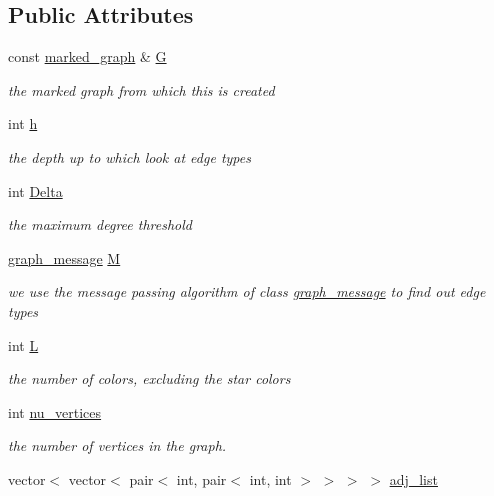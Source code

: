 \subsection*{Public Attributes}
\begin{DoxyCompactItemize}
\item 
const \hyperlink{classmarked__graph}{marked\+\_\+graph} \& \hyperlink{classcolored__graph_a39186b56cad58c368d6947656976e18d}{G}
\begin{DoxyCompactList}\small\item\em the marked graph from which this is created \end{DoxyCompactList}\item 
int \hyperlink{classcolored__graph_ae27062a4ee59df2670d3a0c81e85a3fa}{h}
\begin{DoxyCompactList}\small\item\em the depth up to which look at edge types \end{DoxyCompactList}\item 
int \hyperlink{classcolored__graph_a5b0e93eb40a20dc815c809dee11edc12}{Delta}
\begin{DoxyCompactList}\small\item\em the maximum degree threshold \end{DoxyCompactList}\item 
\hyperlink{classgraph__message}{graph\+\_\+message} \hyperlink{classcolored__graph_ab72c568fe12f7c849ca6bffb145aec47}{M}
\begin{DoxyCompactList}\small\item\em we use the message passing algorithm of class \hyperlink{classgraph__message}{graph\+\_\+message} to find out edge types \end{DoxyCompactList}\item 
int \hyperlink{classcolored__graph_ae159d1b15106b70a2eabef8884501e97}{L}
\begin{DoxyCompactList}\small\item\em the number of colors, excluding the star colors \end{DoxyCompactList}\item 
int \hyperlink{classcolored__graph_a90ece8eb1fec52f3f41549ab527c1d5b}{nu\+\_\+vertices}
\begin{DoxyCompactList}\small\item\em the number of vertices in the graph. \end{DoxyCompactList}\item 
vector$<$ vector$<$ pair$<$ int, pair$<$ int, int $>$ $>$ $>$ $>$ \hyperlink{classcolored__graph_a45dce16965079286cf3f41a54a1b2ea4}{adj\+\_\+list}

\end{DoxyCompactItemize}

